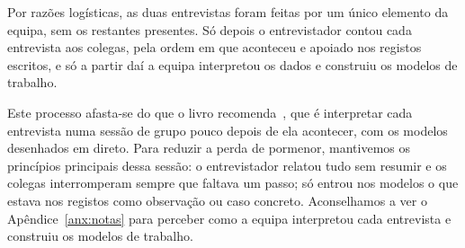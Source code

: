 Por razões logísticas, as duas entrevistas foram feitas por um único elemento da equipa, sem os restantes presentes. Só depois o entrevistador contou cada entrevista aos colegas, pela ordem em que aconteceu e apoiado nos registos escritos, e só a partir daí a equipa interpretou os dados e construiu os modelos de trabalho.

Este processo afasta-se do que o livro recomenda~\cite[cap.~7]{beyer1998}, que é 
interpretar cada entrevista numa sessão de grupo pouco depois de ela acontecer, com 
os modelos desenhados em direto. Para reduzir a perda de pormenor, mantivemos os 
princípios principais dessa sessão: o entrevistador relatou tudo sem resumir e os colegas 
interromperam sempre que faltava um passo; só entrou nos modelos o que estava nos registos como observação ou caso concreto. 
Aconselhamos a ver o Apêndice~\ref{anx:notas} para perceber como a equipa interpretou cada entrevista e construiu os modelos de trabalho.
